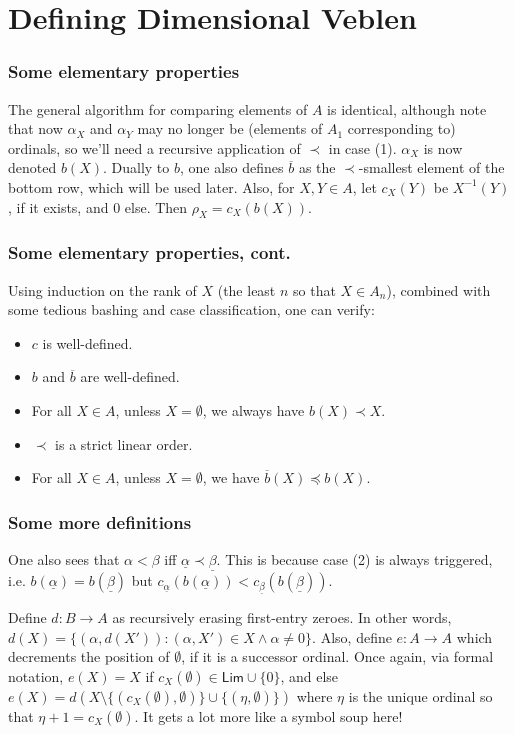 \documentclass{beamer}
\begin{document}
\section{Defining Dimensional Veblen}

\begin{frame}
\frametitle{Some elementary properties}
The general algorithm for comparing elements of $A$ is identical, although note that now $\alpha_X$ and $\alpha_Y$ may no longer be (elements of $A_1$ corresponding to) ordinals, so we'll need a recursive application of $\prec$ in case (1). $\alpha_X$ is now denoted $b(X)$. Dually to $b$, one also defines $\overline{b}$ as the $\prec$-smallest element of the bottom row, which will be used later. Also, for $X, Y \in A$, let $c_X(Y)$ be $X^{-1}(Y)$, if it exists, and $0$ else. Then $\rho_X = c_X(b(X))$. 
\end{frame}

\begin{frame}
\frametitle{Some elementary properties, cont.}
Using induction on the rank of $X$ (the least $n$ so that $X \in A_n$), combined with some tedious bashing and case classification, one can verify:

\begin{itemize}
    \item $c$ is well-defined.
    \item $b$ and $\overline{b}$ are well-defined.
    \item For all $X \in A$, unless $X = \emptyset$, we always have $b(X) \prec X$.
    \item $\prec$ is a strict linear order.
    \item For all $X \in A$, unless $X = \emptyset$, we have $\overline{b}(X) \preceq b(X)$.
\end{itemize}
\end{frame}

\begin{frame}
\frametitle{Some more definitions}

One also sees that $\alpha < \beta$ iff $\underline{\alpha} \prec \underline{\beta}$. This is because case (2) is always triggered, i.e. $b(\underline{\alpha}) = b(\underline{\beta})$ but $c_{\underline{\alpha}}(b(\underline{\alpha})) < c_{\underline{\beta}}(b(\underline{\beta}))$.

\pause

Define $d: B \to A$ as recursively erasing first-entry zeroes. In other words, $d(X) = \{(\alpha,d(X')): (\alpha,X') \in X \land \alpha \neq 0\}$. \pause Also, define $e: A \to A$ which decrements the position of $\emptyset$, if it is a successor ordinal. Once again, via formal notation, $e(X) = X$ if $c_X(\emptyset) \in \mathsf{Lim} \cup \{0\}$, and else $e(X) = d(X \setminus \{(c_X(\emptyset), \emptyset)\} \cup \{(\eta, \emptyset)\})$ where $\eta$ is the unique ordinal so that $\eta + 1 = c_X(\emptyset)$. It gets a lot more like a symbol soup here!
\end{frame}
\end{document}
